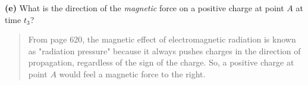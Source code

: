 \documentclass{article}
\begin{document}
\textbf{(e)} What is the direction of the \textit{magnetic} force on a positive charge at point $A$ at time $t_3$?
\begin{quote}
From page 620, the magnetic effect of electromagnetic radiation is known as "radiation pressure" because it always pushes charges in the direction of propagation, regardless of the sign of the charge. So, a positive charge at point $A$ would feel a magnetic force to the right.
\end{quote}
\end{document}
